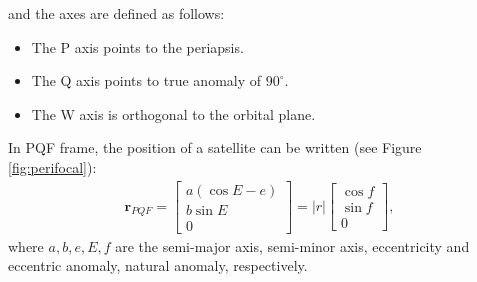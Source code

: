 \documentclass [12pt, a4paper] {article}
\newcommand{\vc}[1]
{
	\boldsymbol{#1}
}
\begin{document}
and the axes are defined as follows:
\begin {itemize}
  \item The P axis points to the periapsis.
  \item The Q axis points to true anomaly of $90^\circ$.
  \item The W axis is orthogonal to the orbital plane.
\end {itemize}
In PQF frame, the position of a satellite can be written (see Figure \ref{fig:perifocal}):
\begin {eqnarray}
  \label{eq:PQF}
  \vc r_{PQF} 
  = 
  \begin {bmatrix}
    a\left(\cos E - e\right) \\ 
    b\sin E \\ 
    0
  \end {bmatrix}
  =
  |r|
  \begin {bmatrix}
    \cos f \\ 
    \sin f \\ 
    0
  \end {bmatrix}
  ,
\end {eqnarray}
where $a, b, e, E, f$ are the semi-major axis, semi-minor axis, eccentricity and 
eccentric anomaly, natural anomaly, respectively. 
\end{document}
